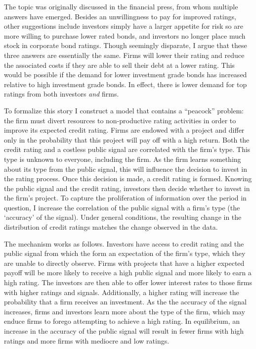 \documentclass[notitlepage]{article}
\begin{document}
The topic was originally discussed in the financial press, from whom multiple answers have emerged. Besides an unwillingness to pay for improved ratings, other suggestions include investors simply have a larger appetite for risk so are more willing to purchase lower rated bonds, and investors no longer place much stock in corporate bond ratings. Though seemingly disparate, I argue that these three answers are essentially the same. Firms will lower their rating and reduce the associated costs if they are able to sell their debt at a lower rating. This would be possible if the demand for lower investment grade bonds has increased relative to high investment grade bonds. In effect, there is lower demand for top ratings from both investors \emph{and} firms.

To formalize this story I construct a model that contains a ``peacock'' problem: the firm must divert resources to non-productive rating activities in order to improve its expected credit rating. Firms are endowed with a project and differ only in the probability that this project will pay off with a high return. Both the credit rating and a costless public signal are correlated with the firm's type. This type is unknown to everyone, including the firm. As the firm learns something about its type from the public signal, this will influence the decision to invest in the rating process. Once this decision is made, a credit rating is formed. Knowing the public signal and the credit rating, investors then decide whether to invest in the firm's project. To capture the proliferation of information over the period in question, I increase the correlation of the public signal with a firm's type (the `accuracy' of the signal). Under general conditions, the resulting change in the distribution of credit ratings matches the change observed in the data.

The mechanism works as follows. Investors have access to credit rating and the public signal from which the form an expectation of the firm's type, which they are unable to directly observe. Firms with projects that have a higher expected payoff will be more likely to receive a high public signal and more likely to earn a high rating. The investors are then able to offer lower interest rates to those firms with higher ratings and signals. Additionally, a higher rating will increase the probability that a firm receives an investment. As the the accuracy of the signal increases, firms and investors learn more about the type of the firm, which may enduce firms to forego attempting to achieve a high rating. In equilibrium, an increase in the accuracy of the public signal will result in fewer firms with high ratings and more firms with mediocre and low ratings.
\end{document}
